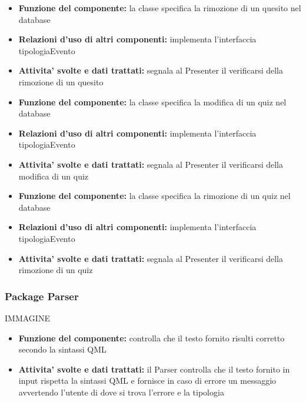 \documentclass[a4paper,11pt]{article}
\begin{document}
			\begin{itemize}
		    	\item\textbf{Funzione del componente:} la classe specifica la rimozione di un quesito nel database
				\item\textbf{Relazioni d'uso di altri componenti:} implementa l'interfaccia tipologiaEvento
				\item\textbf{Attivita' svolte e dati trattati:} segnala al Presenter il verificarsi della rimozione di un quesito
			\end{itemize}
			\begin{itemize}
		    	\item\textbf{Funzione del componente:} la classe specifica la modifica di un quiz nel database
				\item\textbf{Relazioni d'uso di altri componenti:} implementa l'interfaccia tipologiaEvento
				\item\textbf{Attivita' svolte e dati trattati:} segnala al Presenter il verificarsi della modifica di un quiz
			\end{itemize}
			\begin{itemize}
		    	\item\textbf{Funzione del componente:} la classe specifica la rimozione di un quiz nel database
				\item\textbf{Relazioni d'uso di altri componenti:} implementa l'interfaccia tipologiaEvento
				\item\textbf{Attivita' svolte e dati trattati:} segnala al Presenter il verificarsi della rimozione di un quiz
			\end{itemize}
			
			\subsubsection{Package Parser}
			IMMAGINE
 			\begin{itemize}
		    	\item\textbf{Funzione del componente:} controlla che il testo fornito risulti corretto secondo la sintassi QML
			\item\textbf{Attivita' svolte e dati trattati:} il Parser controlla che il testo fornito in input rispetta la sintassi QML e fornisce in caso di errore un messaggio avvertendo l'utente di dove si trova l'errore e la tipologia
			\end{itemize}
			
\end{document}
